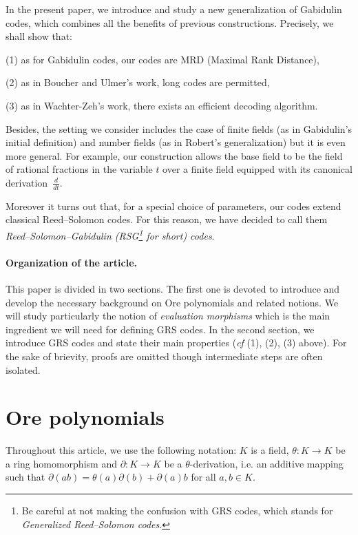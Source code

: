 \documentclass[a4paper]{llncs}
\begin{document}
In the present paper, we introduce and study a new generalization 
of Gabidulin codes, which combines all the benefits of previous 
constructions. Precisely, we shall show that:

\noindent
(1) as for Gabidulin codes, our codes are MRD (Maximal Rank Distance),

\noindent
(2) as in Boucher and Ulmer's work, long codes are permitted,

\noindent
(3) as in Wachter-Zeh's work, there exists an efficient decoding algorithm.

\smallskip

\noindent 
Besides, the setting we consider includes the case of finite fields (as 
in Gabidulin's initial definition) and number fields (as in Robert's 
generalization) but it is even more general. 
For example, our construction allows the base field to be the field of 
rational fractions in the variable $t$ over a finite field equipped with 
its canonical derivation~$\frac d{dt}$.

Moreover it turns out that, for a special choice of parameters, our 
codes extend classical Reed--Solomon codes. For this reason, we have 
decided to call them \emph{Reed--Solomon--Gabidulin (RSG\footnote{Be 
careful at not making the confusion with GRS codes, which stands for 
\emph{Generalized Reed--Solomon codes}.} for short) codes}.

\paragraph{Organization of the article.}

This paper is divided in two sections. 
The first one is devoted to introduce and develop the necessary 
background on Ore polynomials and related notions. We will study
particularly the notion of \emph{evaluation morphisms} which is 
the main ingredient we will need for defining GRS codes.
In the second section, we introduce GRS codes and state their main 
properties (\emph{cf} (1), (2), (3) above). For the sake of brievity, 
proofs are omitted though intermediate steps are often isolated.

\section{Ore polynomials}

Throughout this article, we use the following notation: $K$ is a field, 
$\theta : K \to K$ be a ring homomorphism and $\partial : K \to K$ be a 
$\theta$-derivation, i.e. an additive mapping such that $\partial(ab) = 
\theta(a)\partial(b) + \partial(a)b$ for all $a,b \in K$.
\end{document}
